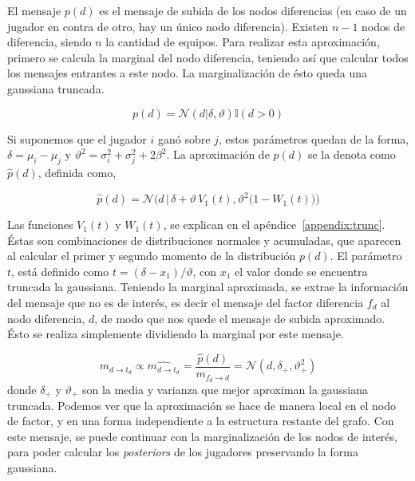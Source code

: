 \documentclass[11pt,twoside,spanish]{report} %
\begin{document}
El mensaje $p(d)$ es el mensaje de subida de los nodos diferencias (en caso de un jugador en contra de otro, hay un \'unico nodo diferencia).
Existen $n-1$ nodos de diferencia, siendo $n$ la cantidad de equipos.
Para realizar esta aproximaci\'on, primero se calcula la marginal del nodo diferencia, teniendo as\'i que calcular todos los mensajes entrantes a este nodo.
La marginalizaci\'on de \'esto queda una gaussiana truncada.

\begin{equation}
	p(d) = \mathcal{N}(d|\delta,\vartheta) \mathbb{I}(d > 0)
\end{equation}

Si suponemos que el jugador $i$ gan\'o sobre $j$, estos par\'ametros quedan de la forma, $\delta = \mu_{i}-\mu_{j}$ y
$\vartheta^2 = \sigma_i^2 + \sigma_j^2+2\beta^2$.
La aproximaci\'on  de $p(d)$ se la denota como $\widehat{p}(d)$, definida como,

\begin{equation}\label{eq:aprox}
\widehat{p}(d) = \mathcal{N}\Bigg(d \,  \bigg| \,  \delta + \vartheta \, V_1(t) ,  \vartheta^2 \big( 1 - W_1(t) \big)  \Bigg)
\end{equation}

Las funciones $V_1(t)$ y $W_1(t)$, se explican en el ap\'endice~\ref{appendix:trunc}.
\'Estas son combinaciones de distribuciones normales y acumuladas, que aparecen al calcular el primer y segundo momento de la distribuci\'on $p(d)$.
El par\'ametro $t$, est\'a definido como $t = (\delta-x_1)/\vartheta$, con $x_1$ el valor donde se encuentra truncada la gaussiana.
Teniendo la marginal aproximada, se extrae la informaci\'on del mensaje que no es de inter\'es, es decir el mensaje del factor diferencia $f_d$ al nodo diferencia, $d$, de modo que nos quede el mensaje de subida aproximado.
\'Esto se realiza simplemente dividiendo la marginal por este mensaje.

\begin{equation}\label{eq:aprox_}
 m_{d \rightarrow t_d} \propto\widehat{m_{d \rightarrow t_d}} = \frac{\widehat{p}(d)}{m_{f_d \rightarrow d}} = \mathcal{N}(d,\delta_{\div},\vartheta_{\div}^2 )
\end{equation}
donde $\delta_{\div}$ y $\vartheta_{\div}$ son la media y varianza que mejor aproximan la gaussiana truncada.
Podemos ver que la aproximaci\'on se hace de manera local en el nodo de factor, y en una forma independiente a la estructura restante del grafo.
Con este mensaje, se puede continuar con la marginalizaci\'on de los nodos de inter\'es, para poder calcular los \textit{posteriors} de los jugadores preservando la forma gaussiana.
\end{document}
